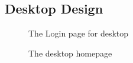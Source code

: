 \documentclass[draftclsnofoot,onecolumn,journal,letterpaper,compsoc,10pt]{IEEEtran}
\begin{document}
    \subsection{Desktop Design}
    \begin{figure}[H]
        \centering
        \caption{The Login page for desktop}
        \label{login-page}
    \end{figure}
    \begin{figure}[H]
        \centering
        \caption{The desktop homepage}
        \label{home-page}
    \end{figure}
\end{document}

